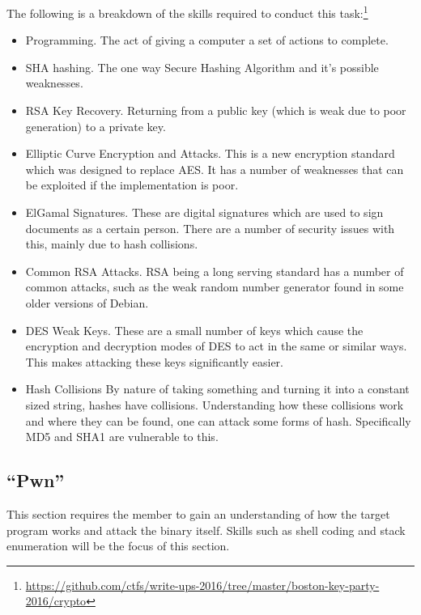 \documentclass[a4paper,11pt]{report}
\begin{document}
			The following is a breakdown of the skills required to conduct this task:\footnote{\url{https://github.com/ctfs/write-ups-2016/tree/master/boston-key-party-2016/crypto}}
			\begin{itemize}
				\item Programming.
					The act of giving a computer a set of actions to complete. 
				\item SHA hashing. 
					The one way Secure Hashing Algorithm and it's possible weaknesses. 
				\item RSA Key Recovery.
					Returning from a public key (which is weak due to poor generation) to a private key. 
				\item Elliptic Curve Encryption and Attacks.
					This is a new encryption standard which was designed to replace AES. 
					It has a number of weaknesses that can be exploited if the implementation is poor. 
				\item ElGamal Signatures.
					These are digital signatures which are used to sign documents as a certain person. 
					There are a number of security issues with this, mainly due to hash collisions. 
				\item Common RSA Attacks. 
					RSA being a long serving standard has a number of common attacks, such as the weak random number generator found in some older versions of Debian. 
				\item DES Weak Keys. 
					These are a small number of keys which cause the encryption and decryption modes of DES to act in the same or similar ways. 
					This makes attacking these keys significantly easier. 
				\item Hash Collisions
					By nature of taking something and turning it into a constant sized string, hashes have collisions. 
					Understanding how these collisions work and where they can be found, one can attack some forms of hash. 
					Specifically MD5 and SHA1 are vulnerable to this. 
			\end{itemize}
		\subsection{``Pwn''}
			This section requires the member to gain an understanding of how the target program works and attack the binary itself. 
			Skills such as shell coding and stack enumeration will be the focus of this section. 
\end{document}
